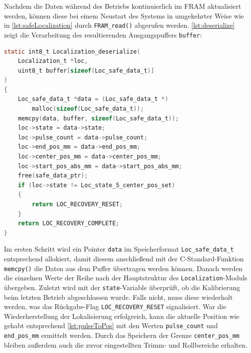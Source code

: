 \noindent
Nachdem die Daten während des Betriebs kontinuierlich im FRAM aktualisiert werden, können diese bei einem Neustart des Systems in umgekehrter Weise wie in \autoref{lst:safeLocalization} durch \verb|FRAM_read()| abgerufen werden. \autoref{lst:deserialize} zeigt die Verarbeitung des resultierenden Ausgangspuffers \verb|buffer|:
\begin{lstlisting}[language=C, caption={Auslesen der Positionsdaten aus dem FRAM-Puffer}, label={lst:deserialize}]
static int8_t Localization_deserialize(
	Localization_t *loc, 
	uint8_t buffer[sizeof(Loc_safe_data_t)]
)
{
	Loc_safe_data_t *data = (Loc_safe_data_t *)
		malloc(sizeof(Loc_safe_data_t));
	memcpy(data, buffer, sizeof(Loc_safe_data_t));
	loc->state = data->state;
	loc->pulse_count = data->pulse_count;
	loc->end_pos_mm = data->end_pos_mm;
	loc->center_pos_mm = data->center_pos_mm;
	loc->start_pos_abs_mm = data->start_pos_abs_mm;
	free(safe_data_ptr);
	if (loc->state != Loc_state_5_center_pos_set)
	{
		return LOC_RECOVERY_RESET;
	}
	return LOC_RECOVERY_COMPLETE;
}
\end{lstlisting}
Im ersten Schritt wird ein Pointer \verb|data| im Speicherformat \verb|Loc_safe_data_t| entsprechend allokiert, damit diesem anschließend mit der C-Standard-Funktion \verb|memcpy()| die Daten aus dem Puffer übertragen werden können. Danach werden die einzelnen Werte der Reihe nach der Hauptstruktur des \verb|Localization|-Moduls übergeben. Zuletzt wird mit der \verb|state|-Variable überprüft, ob die Kalibrierung beim letzten Betrieb abgeschlossen wurde. Falls nicht, muss diese wiederholt werden, was das Rückgabe-Flag \verb|LOC_RECOVERY_RESET| signalisiert. War die Wiederherstellung der Lokalisierung erfolgreich, kann die aktuelle Position wie gehabt entsprechend \autoref{lst:pulseToPos} mit den Werten \verb|pulse_count| und \verb|end_pos_mm| ermittelt werden. Durch das Speichern der Grenze \verb|center_pos_mm| bleiben außerdem auch die zuvor eingestellten Trimm- und Rollbereiche erhalten.
